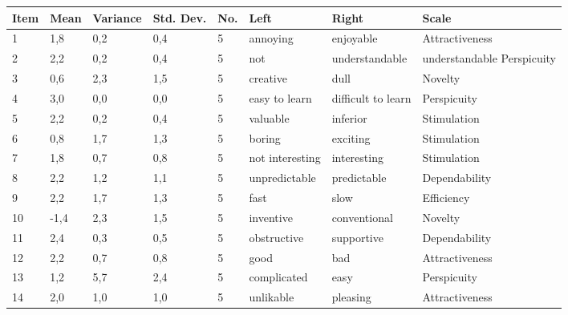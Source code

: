 \documentclass[conference,onecolumn]{IEEEtran}
\begin{document}
    \begin{table}[H]	
        \begin{center}
            \begin{tabular}[H]{ |m{1cm}|m{1cm}|m{1cm}|m{1cm}|m{1cm}|m{3cm}|m{3cm}|m{3cm}|}
                \hline
                \textbf{Item}&\textbf{Mean} &\textbf{Variance} &\textbf{Std. Dev.}  &\textbf{No.}  &\textbf{Left} &\textbf{Right} &\textbf{Scale}\\ \hline
                1	&1,8	&0,2	&0,4	&5	&annoying	            &enjoyable	                &Attractiveness             \\ \hline
                2	&2,2	&0,2	&0,4	&5	&not                    &understandable	            &understandable	Perspicuity         \\ \hline
                3	&0,6	&2,3	&1,5	&5	&creative	            &dull	                    &Novelty        \\ \hline
                4	&3,0	&0,0	&0,0	&5	&easy to learn	        &difficult to learn	        &Perspicuity        \\ \hline
                5	&2,2	&0,2	&0,4	&5	&valuable	            &inferior	                &Stimulation        \\ \hline
                6	&0,8	&1,7	&1,3	&5	&boring	                &exciting	                &Stimulation        \\ \hline
                7	&1,8	&0,7	&0,8	&5	&not interesting	    &interesting	            &Stimulation        \\ \hline
                8	&2,2	&1,2	&1,1	&5	&unpredictable	        &predictable	            &Dependability      \\ \hline
                9	&2,2	&1,7	&1,3	&5	&fast	                &slow	                    &Efficiency     \\ \hline
                10	&-1,4	&2,3	&1,5	&5	&inventive	            &conventional	            &Novelty        \\ \hline
                11	&2,4	&0,3	&0,5	&5	&obstructive	        &supportive	                &Dependability      \\ \hline
                12	&2,2	&0,7	&0,8	&5	&good	                &bad	                    &Attractiveness     \\ \hline
                13	&1,2	&5,7	&2,4	&5	&complicated	        &easy	                    &Perspicuity        \\ \hline
                14	&2,0	&1,0	&1,0	&5	&unlikable	            &pleasing	                &Attractiveness     \\ \hline

\end{tabular}
\end{center}
\end{table}
\end{document}
